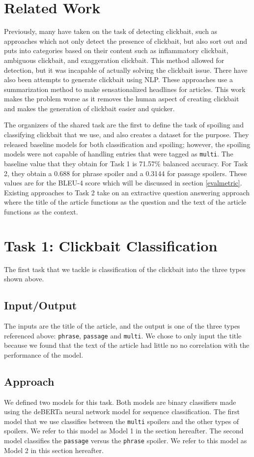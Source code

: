 \documentclass[12pt]{article}
\begin{document}
\section{Related Work}
Previously, many have taken on the task of detecting clickbait, such as approaches which not only detect the presence of clickbait, but also sort out and puts into categories based on their content such as inflammatory clickbait, ambiguous clickbait, and exaggeration clickbait. \cite{pujahari_sisodia_2019} This method allowed for detection, but it was incapable of actually solving the clickbait issue. There have also been attempts to generate clickbait using NLP. These approaches use a summarization method to make sensationalized headlines for articles. \cite{xu_wu_madotto_fung} This work makes the problem worse as it removes the human aspect of creating clickbait and makes the generation of clickbait easier and quicker.  



The organizers of the shared task are the first to define the task of spoiling and classifying clickbait that we use, and also creates a dataset for the purpose. They released baseline models for both classification and spoiling; however, the spoiling models were not capable of handling entries that were tagged as \texttt{multi}. The baseline value that they obtain for Task 1 is 71.57\% balanced accuracy. For Task 2, they obtain a 0.688 for phrase spoiler and a 0.3144 for passage spoilers. These values are for the BLEU-4 score which will be discussed in section \ref{evalmetric}. Existing approaches to Task 2 take on an extractive question answering approach where the title of the article functions as the question and the text of the article functions as the context.
\section{Task 1: Clickbait Classification}
The first task that we tackle is classification of the clickbait into the three types shown above.
\subsection{Input/Output}
The inputs are the title of the article, and the output is one of the three types referenced above: \texttt{phrase}, \texttt{passage} and \texttt{multi}. We chose to only input the title because we found that the text of the article had little no no correlation with the performance of the model.
 \subsection{Approach}
We defined two models for this task. Both models are binary classifiers made using the deBERTa \cite{DBLP:journals/corr/abs-2006-03654}
neural network model for sequence classification. The first model that we use classifies between the \texttt{multi} spoilers and the other types of spoilers. We refer to this model as Model 1 in the section hereafter. The second model classifies the \texttt{passage} versus the \texttt{phrase} spoiler. We refer to this model as Model 2 in this section hereafter.
\end{document}
